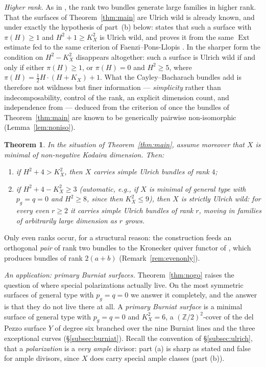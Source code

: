 \documentclass{amsart}
\newtheorem{theorem}{Theorem}[section]
\theoremstyle{definition}
\newcommand{\ZZ}{\mathbb{Z}}
\newcommand{\Ext}{\operatorname{Ext}}
\begin{document}
\smallskip
\noindent\emph{Higher rank.} As in \cite{CHGS12,Cas17,CasWild}, the rank two bundles generate large families in higher rank. That the surfaces of Theorem~\ref{thm:main} are Ulrich wild is already known, and under exactly the hypothesis of part~(b) below: \cite[Lem.~5.2]{Cas17} states that such a surface with $\pi(H)\ge1$ and $H^2+1\ge K_X^2$ is Ulrich wild, and proves it from the same $\Ext$ estimate fed to the same criterion of Faenzi--Pons-Llopis \cite{FPL}. In the sharper form \cite[Thm.~1.3]{Cas17} the condition on $H^2-K_X^2$ disappears altogether: such a surface is Ulrich wild if and only if either $\pi(H)\ge1$, or $\pi(H)=0$ and $H^2\ge5$, where $\pi(H)=\tfrac12H\cdot(H+K_X)+1$. What the Cayley--Bacharach bundles add is therefore not wildness but finer information --- \emph{simplicity} rather than indecomposability, control of the rank, an explicit dimension count, and independence from \cite[Thm.~1.2]{Cas17} --- deduced from the criterion of \cite{FPL} once the bundles of Theorem~\ref{thm:main} are known to be generically pairwise non-isomorphic (Lemma~\ref{lem:noniso}).

\begin{theorem}\label{thm:evenrank}
In the situation of Theorem~\ref{thm:main}, assume moreover that $X$ is minimal of non-negative Kodaira dimension. Then:
\begin{enumerate}[label=\textup{(\alph*)}]
\item if $H^2+4>K_X^2$, then $X$ carries simple Ulrich bundles of rank $4$;
\item if $H^2+4-K_X^2\ge 3$ \textup{(}automatic, e.g., if $X$ is minimal of general type with $p_g=q=0$ and $H^2\ge 8$, since then $K_X^2\le 9$\textup{)}, then $X$ is strictly Ulrich wild: for every even $r\ge2$ it carries simple Ulrich bundles of rank $r$, moving in families of arbitrarily large dimension as $r$ grows.
\end{enumerate}
\end{theorem}

Only even ranks occur, for a structural reason: the construction feeds an orthogonal \emph{pair} of rank two bundles to the Kronecker quiver functor of \cite{FPL}, which produces bundles of rank $2(a+b)$ (Remark~\ref{rem:evenonly}).

\smallskip
\noindent\emph{An application: primary Burniat surfaces.} Theorem~\ref{thm:nogo} raises the question of where special polarizations actually live. On the most symmetric surfaces of general type with $p_g=q=0$ we answer it completely, and the answer is that they do not live there at all. A \emph{primary Burniat surface} is a minimal surface of general type with $p_g=q=0$ and $K_X^2=6$, a $(\ZZ/2)^2$-cover of the del Pezzo surface $Y$ of degree six branched over the nine Burniat lines and the three exceptional curves (\S\ref{subsec:burniat}). Recall the convention of \S\ref{subsec:ulrich}, that a \emph{polarization} is a \emph{very ample} divisor: part (a) is sharp as stated and false for ample divisors, since $X$ does carry special ample classes (part (b)).
\end{document}
